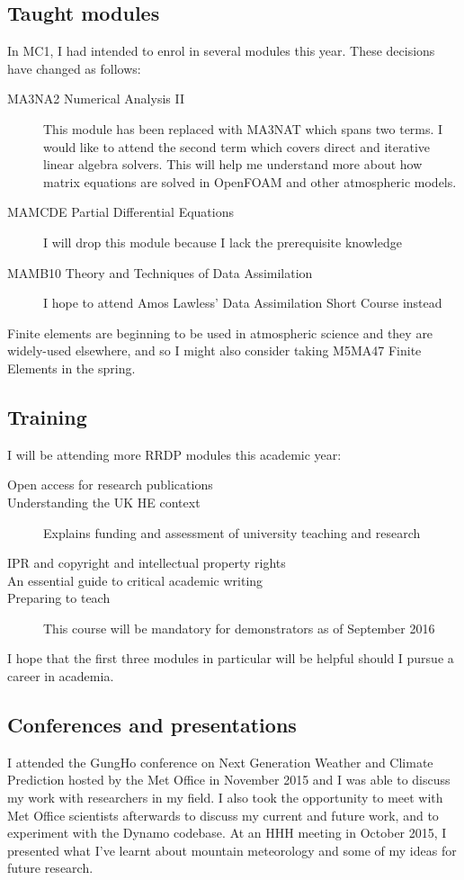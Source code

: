 \documentclass[a4paper]{article}
\begin{document}
\subsection*{Taught modules}
In MC1, I had intended to enrol in several modules this year.  These decisions have changed as follows:
\begin{description}
\item[MA3NA2 Numerical Analysis II]{This module has been replaced with MA3NAT which spans two terms.  I would like to attend the second term which covers direct and iterative linear algebra solvers.  This will help me understand more about how matrix equations are solved in OpenFOAM and other atmospheric models.}
\item[MAMCDE Partial Differential Equations]{I will drop this module because I lack the prerequisite knowledge}
\item[MAMB10 Theory and Techniques of Data Assimilation]{I hope to attend Amos Lawless' Data Assimilation Short Course instead}
\end{description}
Finite elements are beginning to be used in atmospheric science and they are widely-used elsewhere, and so I might also consider taking M5MA47 Finite Elements in the spring.

\subsection*{Training}
I will be attending more RRDP modules this academic year:
\begin{description}
	\item[Open access for research publications]{}
	\item[Understanding the UK HE context]{Explains funding and assessment of university teaching and research}
	\item[IPR and copyright and intellectual property rights]{}
	\item[An essential guide to critical academic writing]{}
	\item[Preparing to teach]{This course will be mandatory for demonstrators as of September 2016}
\end{description}
I hope that the first three modules in particular will be helpful should I pursue a career in academia.

\subsection*{Conferences and presentations}
I attended the GungHo conference on Next Generation Weather and Climate Prediction hosted by the Met Office in November 2015 and I was able to discuss my work with researchers in my field.  I also took the opportunity to meet with Met Office scientists afterwards to discuss my current and future work, and to experiment with the Dynamo codebase.  At an HHH meeting in October 2015, I presented what I've learnt about mountain meteorology and some of my ideas for future research.
\end{document}
